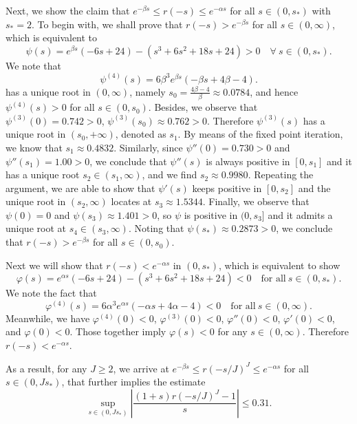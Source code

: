 Next, we show the claim that $e^{-\beta s} \le r(-s) \le e^{-\alpha s}$ for all $s\in(0,s_*)$ with $s_*=2$. To begin with, we shall prove that $r(-s) > e^{-\beta s}$ for all $s\in(0,\infty)$, which is equivalent to
$$\psi(s) = e^{\beta s} (-6s+24) - (s^3+6s^2+18s+24) >0
\quad \forall ~s\in (0, s_*).$$
We note that
$$\psi^{(4)}(s) = 6\beta^3e^{\beta s}(-\beta s + 4\beta - 4).$$
has a unique root in $(0,\infty)$, namely
$s_0= \frac{4\beta - 4}{\beta} \approx0.0784$, and hence
$\psi^{(4)}(s)> 0$ for all $s\in(0,s_0)$.
Besides, we observe that
$\psi^{(3)}(0) = 0.742 >0$, $\psi^{(3)}(s_0) \approx 0.762 >0$.
Therefore $\psi^{(3)}(s)$ has a unique root
in $(s_0, +\infty)$,
denoted as $s_1$. By means of the fixed point iteration, we know that
$s_1\approx 0.4832$.
Similarly, since $\psi''(0) =  0.730>0$ and $\psi''(s_1) =  1.00>0$, we conclude that $\psi''(s)$ is always positive in $[0,s_1]$ and it
has a unique root $s_2\in (s_1,\infty)$, and we find $s_2\approx 0.9980$.
Repeating the argument, we are able to show that
$\psi'(s)$ keeps positive in $[0,s_2]$ and
the unique root in $(s_2,\infty)$ locates at
$s_3 \approx 1.5344$.
Finally, we observe that $\psi(0) = 0$ and $\psi(s_3) \approx 1.401>0$, so $\psi$ is positive in $(0,s_3]$
and it admits a unique root at $s_4\in(s_3,\infty)$.
Noting that $\psi(s_*) \approx 0.2873 > 0$,
we conclude that $r(-s) > e^{-\beta s}$ for all $s\in(0,s_0)$.

Next we will show that $r(-s) < e^{-\alpha s}$ in $(0, s_*)$, which is equivalent to show
\begin{equation*}
    \varphi(s) = e^{\alpha s} (-6s+24) - (s^3+6s^2+18s+24) < 0 \quad \text{for all} ~s\in (0, s_*).
\end{equation*}
We note the fact that
\begin{equation*}
\varphi^{(4)}(s) = 6\alpha^3e^{\alpha s}(-\alpha s + 4\alpha - 4)<0\quad \text{for all} ~s\in (0, \infty).
\end{equation*}
Meanwhile, we have $\varphi^{(4)}(0)<0$, $\varphi^{(3)}(0)<0$, $\varphi''(0)<0$, $\varphi'(0)<0$, and $\varphi(0)<0$.
Those together imply $\varphi(s) <0$ for any
$s\in (0, \infty)$. Therefore $r(-s) < e^{-\alpha s}$.

As a result, for any $J\ge 2$, we arrive at $e^{-\beta s} \le r(-s/J)^J \le e^{-\alpha s}$
for all $s\in(0, J s_*)$, that further implies the estimate
\begin{equation*}
    \sup_{s\in(0, J s_*)}
    \left|\frac{(1+s) r(-s/J)^J-1}{s}\right| \le 0.31.
\end{equation*}

